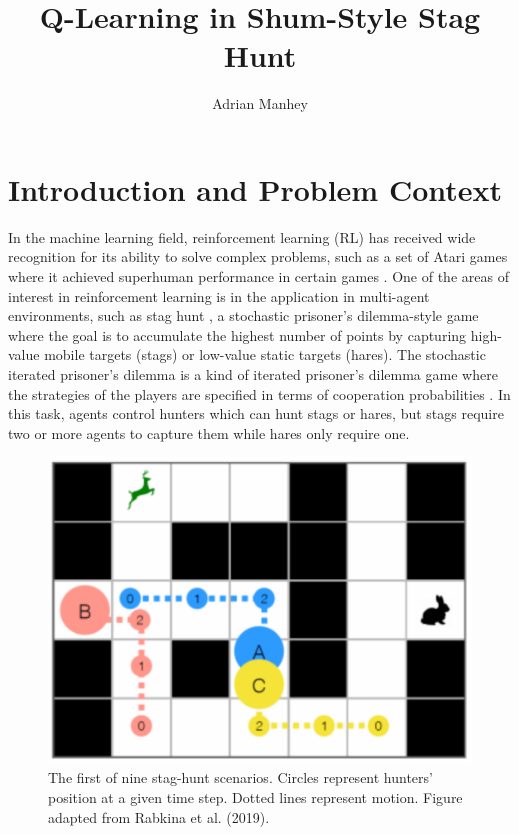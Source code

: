 \documentclass[10pt,twocolumn]{article}
\title{Q-Learning in Shum-Style Stag Hunt}
\author{Adrian Manhey}
\affiliation{Occidental College}
\begin{document}
\maketitle

\section{Introduction and Problem Context}

In the machine learning field, reinforcement learning (RL) has received wide recognition for its ability to solve complex problems, such as a set of Atari games where it achieved superhuman performance in certain games \cite{Volodymyr2013}.
One of the areas of interest in reinforcement learning is in the application in multi-agent environments, such as stag hunt \cite{Skyrms2001}, a stochastic prisoner’s dilemma-style game where the goal is to accumulate the highest number of points by capturing high-value mobile targets (stags) or low-value static targets (hares).
The stochastic iterated prisoner’s dilemma is a kind of iterated prisoner’s dilemma game where the strategies of the players are specified in terms of cooperation probabilities \cite{Li2014}.
In this task, agents control hunters which can hunt stags or hares, but stags require two or more agents to capture them while hares only require one.

\begin{figure}[ht]
\centering
\includegraphics[width=0.75\linewidth]{Assets/scenario_one.png}
\vspace{0.5cm}
\caption{The first of nine stag-hunt scenarios. Circles represent hunters’ position at a given time step. Dotted lines represent motion. Figure adapted from Rabkina et al. (2019).}
\label{Figure:1}
\end{figure}
\end{document}
